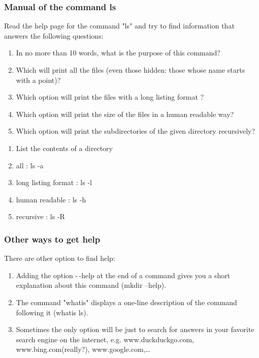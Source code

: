\documentclass[11pt]{article}
\begin{document}
\subsubsection{Manual of the command \textbf{ls}}

Read the help page for the command "ls" and try to find information that answers the following questions:

\begin{enumerate}
	\item In no more than 10 words, what is the purpose of this command?
	\item Which will print all the files (even those hidden: those whose name starts with a point)?
	\item Which option will print the files with a long listing format ?
	\item Which option will print the size of the files in a human readable way?
	\item Which option will print the subdirectories of the given directory recursively?
	
\end{enumerate}

\begin{solution}
	\begin{enumerate}
		\item List the contents of a directory
		\item all : ls -a
		\item long listing format : ls -l
		\item human readable : ls -h
		\item recursive : ls -R
	\end{enumerate}
\end{solution}


\subsubsection{Other ways to get help}
There are other option to find help:
\begin{enumerate}
	\item Adding the option -\,-help at the end of a command gives you a short explanation about this command (mkdir --help).
	\item The command "whatis" displays a one-line description of the command following it (whatis ls).
	\item Sometimes the only option will be just to search for answers in your favorite search engine on the internet, e.g. www.duckduckgo.com, www.bing.com(really?), www.google.com,\ldots
\end{enumerate}
\end{document}
